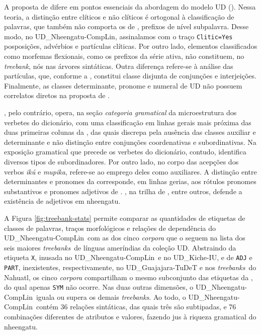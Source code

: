 \documentclass[portuguese]{textolivre}
\newcommand{\udc}{coleção UD}
\newcommand{\tbc}{UD\_Nheengatu-CompLin}
\newcommand{\tbs}{\textit{treebanks}}
\newcommand{\tb}{\textit{treebank}}
\begin{document}
A proposta de \textcite{cruz2011} difere em pontos essenciais da abordagem do modelo UD (). Nessa teoria, a distinção entre clíticos e não clíticos é ortogonal à classificação de palavras, que também não comporta os  de \textcite{cruz2011}, prefixos de nível subpalavra. Desse modo, no \tbc, assinalamos com o traço \texttt{Clitic=Yes} posposições, advérbios e partículas clíticas. Por outro lado, elementos classificados como morfemas flexionais, como os prefixos da série ativa, não constituem, no \tb, nós nas árvores sintáticas. Outra diferença refere-se à análise das partículas, que, conforme a , constitui classe disjunta de conjunções e interjeições. Finalmente, as classes determinante, pronome e numeral de UD não possuem correlatos diretos na proposta de \textcite{cruz2011}. 

\textcite{avila2021}, pelo contrário, opera, na seção \textit{categoria gramatical} da microestrutura dos verbetes do dicionário, com uma classificação em linhas gerais mais próxima das duas primeiras colunas da , das quais discrepa pela ausência das classes auxiliar e determinante e não distinção entre conjunções coordenativas e subordinativas. Na exposição gramatical que precede os verbetes do dicionário, contudo, \textcite{avila2021} identifica diversos tipos de subordinadores. Por outro lado, no corpo das acepções dos verbos \textit{ikú} e \textit{mupika}, refere-se ao emprego deles como auxiliares. A distinção entre determinantes e pronomes da  corresponde, em linhas gerias, aos rótulos pronomes substantivos e pronomes adjetivos de \textcite{avila2021}. \textcite{avila2021}, na trilha de \textcite{moore-facundes-pires-1994}, entre outros, defende a existência de adjetivos em nheengatu. 

A Figura \ref{fig:treebank-stats} permite comparar as quantidades de etiquetas de classes de palavras, traços morfológicos e relações de dependência do \tbc~com as dos cinco \textit{corpora} que o seguem na lista dos seis maiores \tbs~de línguas ameríndias da \udc. Abstraindo da etiqueta \texttt{X}, inusada no \tbc~e no UD\_Kiche-IU, e de \texttt{ADJ} e \texttt{PART}, inexistentes, respectivamente, no UD\_Guajajara-TuDeT e nos \tbs~do Nahuatl, os cinco \textit{corpora} compartilham o mesmo subconjunto das etiquetas da , do qual apenas \texttt{SYM} não ocorre. Nas duas outras dimensões, o \tbc~iguala ou supera os demais \tbs. Ao todo, o \tbc~contém 36 relações sintáticas, das quais três são subtipadas, e 76 combinações diferentes de atributos e valores, fazendo jus à riqueza gramatical do nheengatu.    
\end{document}
